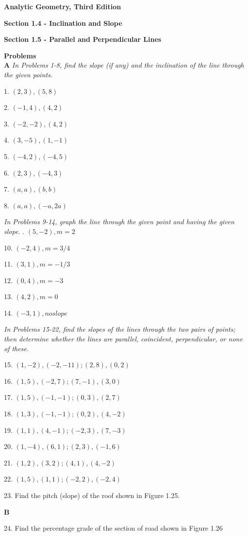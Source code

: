 \documentclass[10pt,letterpaper]{article}
\begin{document}
\textbf{Analytic Geometry, Third Edition}

\textbf{Section 1.4 - Inclination and Slope}

\textbf{Section 1.5 - Parallel and Perpendicular Lines}

\medskip
\textbf{Problems}\\

\textbf{A} \textit{In Problems 1-8, find the slope (if any) and the inclination of the line through the given points.}
\medskip

1. $(2,3),(5,8)$

2. $(-1,4),(4,2)$

3. $(-2,-2),(4,2)$

4. $(3,-5),(1,-1)$

5. $(-4,2),(-4,5)$

6. $(2,3),(-4,3)$

7. $(a,a), (b,b)$

8. $(a,a), (-a,2a)$


\medskip
\textit{In Problems 9-14, graph the line through the given point and having the given slope.}
. $(5,-2), m=2$

10. $(-2,4), m=3/4$

11. $(3,1), m= -1/3$

12. $(0,4), m=-3$

13. $(4,2), m=0$

14. $(-3,1), no slope$

\medskip
\textit{In Problems 15-22, find the slopes of the lines through the two pairs of points; then determine whether the lines are parallel, coincident, perpendicular, or none of these.}
\medskip

15. $(1,-2),(-2,-11); (2,8),(0,2)$

16. $(1,5),(-2,7); (7,-1),(3,0)$

17. $(1,5),(-1,-1); (0,3),(2,7)$

18. $(1,3),(-1,-1); (0,2),(4,-2)$

19. $(1,1),(4,-1); (-2,3),(7,-3)$

20. $(1,-4),(6,1); (2,3),(-1,6)$

21. $(1,2),(3,2); (4,1),(4,-2)$

22. $(1,5),(1,1); (-2,2),(-2,4)$

23. Find the pitch (slope) of the roof shown in Figure 1.25.

\medskip
\textbf{B}
\medskip

24. Find the percentage grade of the section of road shown in Figure 1.26
\end{document}
